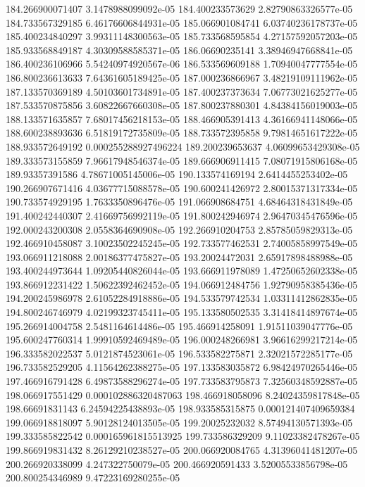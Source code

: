 {184.266900071407 3.1478988099092e-05
184.400233573629 2.82790863326577e-05
184.733567329185 6.46176606844931e-05
185.066901084741 6.03740236178737e-05
185.400234840297 3.99311148300563e-05
185.733568595854 4.27157592057203e-05
185.933568849187 4.30309588585371e-05
186.06690235141 3.38946947668841e-05
186.400236106966 5.54240974920567e-06
186.533569609188 1.70940047777554e-05
186.800236613633 7.64361605189425e-05
187.000236866967 3.48219109111962e-05
187.133570369189 4.50103601734891e-05
187.400237373634 7.06773021625277e-05
187.533570875856 3.60822667660308e-05
187.800237880301 4.84384156019003e-05
188.133571635857 7.68017456218153e-05
188.466905391413 4.36166941148066e-05
188.600238893636 6.51819172735809e-05
188.733572395858 9.79814651617222e-05
188.933572649192 0.000255288927496224
189.200239653637 4.06099653429308e-05
189.333573155859 7.96617948546374e-05
189.666906911415 7.08071915806168e-05
189.93357391586 4.78671005145006e-05
190.133574169194 2.6414455253402e-05
190.266907671416 4.03677715088578e-05
190.600241426972 2.80015371317334e-05
190.733574929195 1.7633350896476e-05
191.066908684751 4.68464318431849e-05
191.400242440307 2.41669756992119e-05
191.800242946974 2.96470345476596e-05
192.000243200308 2.0558364690908e-05
192.266910204753 2.85785059829313e-05
192.466910458087 3.10023502245245e-05
192.733577462531 2.74005858997549e-05
193.066911218088 2.00186377475827e-05
193.20024472031 2.65917898488988e-05
193.400244973644 1.09205440826044e-05
193.666911978089 1.47250652602338e-05
193.866912231422 1.50622392462452e-05
194.066912484756 1.92790958385436e-05
194.200245986978 2.61052284918886e-05
194.533579742534 1.03311412862835e-05
194.800246746979 4.02199323745411e-05
195.133580502535 3.31418414897674e-05
195.266914004758 2.5481164614486e-05
195.466914258091 1.91511039047776e-05
195.600247760314 1.99910592469489e-05
196.000248266981 3.96616299217214e-05
196.333582022537 5.0121874523061e-05
196.533582275871 2.32021572285177e-05
196.733582529205 4.11564262388275e-05
197.133583035872 6.98424970265446e-05
197.466916791428 6.49873588296274e-05
197.733583795873 7.32560348592887e-05
198.066917551429 0.000102886320487063
198.466918058096 8.24024359817848e-05
198.66691831143 6.24594225438893e-05
198.933585315875 0.000121407409659384
199.066918818097 5.90128124013505e-05
199.20025232032 8.57494130571393e-05
199.333585822542 0.000165961815513925
199.733586329209 9.11023382478267e-05
199.866919831432 8.26129210238527e-05
200.066920084765 4.31396041481207e-05
200.266920338099 4.247322750079e-05
200.466920591433 3.52005533856798e-05
200.800254346989 9.47223169280255e-05
}

